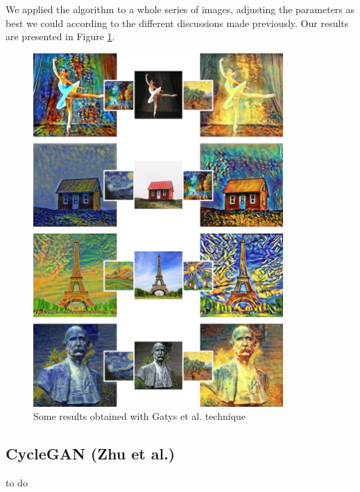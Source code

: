 \documentclass[twocolumn,superscriptaddress,aps, floatfix]{revtex4-1}
\begin{document}
    We applied the algorithm to a whole series of images, adjusting the parameters as best we could according to the different discussions made previously. Our results are presented in Figure \ref{fig:final.results.gatys}.
    
    \begin{figure}[ht]
        \centering
        \includegraphics[width=0.85\textwidth]{resources/png/gatys-final.png}
        \caption{Some results obtained with Gatys et al. technique}
        \label{fig:final.results.gatys}
    \end{figure}
    
    \subsection{CycleGAN (Zhu et al.)}\label{results.zhu}
    
    to do
    
    
    
    
\end{document}
